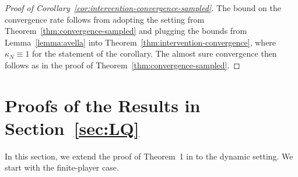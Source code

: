 \documentclass[11pt]{article}
\numberwithin{equation}{section}
\begin{document}
\begin{proof}[Proof of Corollary~\ref{cor:intervention-convergence-sampled}]
The bound on the convergence rate follows from adopting the setting from Theorem~\ref{thm:convergence-sampled} and plugging the bounds from Lemma~\ref{lemma:avella} into Theorem~\ref{thm:intervention-convergence}, where $\kappa_N\equiv 1$ for the statement of the corollary. The almost sure convergence then follows as in the proof of Theorem~\ref{thm:convergence-sampled}.   
\end{proof}

\section{Proofs of the Results in Section~\ref{sec:LQ}}\label{sec:LQ-proofs} 
In this section, we extend the proof of Theorem~1 in \cite{galeotti2020targeting} to the dynamic setting. We start with the finite-player case.
\end{document}
